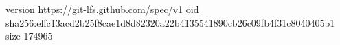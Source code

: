 version https://git-lfs.github.com/spec/v1
oid sha256:effc13acd2b25f8cae1d8d82320a22b4135541890cb26c09fb4f31c8040405b1
size 174965
